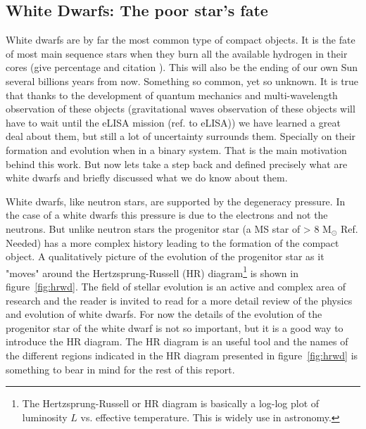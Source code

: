 \subsection[White Dwarfs]{White Dwarfs: The poor star's fate}\label{sec:wd} 

White dwarfs are by far the most common type of compact objects. It is the fate of most main sequence stars when they burn all the available hydrogen in their cores (give percentage and citation \cite{a}). This will also be the ending of our own Sun several billions years from now. Something so common, yet so unknown. It is true that thanks to the development of quantum mechanics and multi-wavelength observation of these objects (gravitational waves observation of these objects will have to wait until the eLISA mission (ref. to eLISA\cite{a})) we have learned a great deal about them, but still a lot of uncertainty surrounds them. Specially on their formation and evolution when in a binary system. That is the main motivation behind this work. But now lets take a step back and defined precisely what are white dwarfs and briefly discussed what we do know about them. 

White dwarfs, like neutron stars, are supported by the degeneracy pressure. In the case of a white dwarfs this pressure is due to the electrons and not the neutrons. But unlike neutron stars the progenitor star (a MS star of > 8 M$_\odot$ \cite{a} Ref. Needed) has a more complex history leading to the formation of the compact object. A qualitatively picture of the evolution of the progenitor star as it "moves" around the Hertzsprung-Russell (HR) diagram\footnote{ The Hertzsprung-Russell or HR diagram is basically a log-log plot of luminosity $L$ vs. effective temperature. This is widely use in astronomy.} is shown in figure~\ref{fig:hrwd}. The field of stellar evolution is an active and complex area of research and the reader is invited to read \cite{koester_physics_1990} for a more detail review of the physics and evolution of white dwarfs. For now the details of the evolution of the progenitor star of the white dwarf is not so important, but it is a good way to introduce the HR diagram. The HR diagram is an useful tool and the names of the different regions indicated in the HR diagram presented in figure~\ref{fig:hrwd} is something to bear in mind for the rest of this report.  

